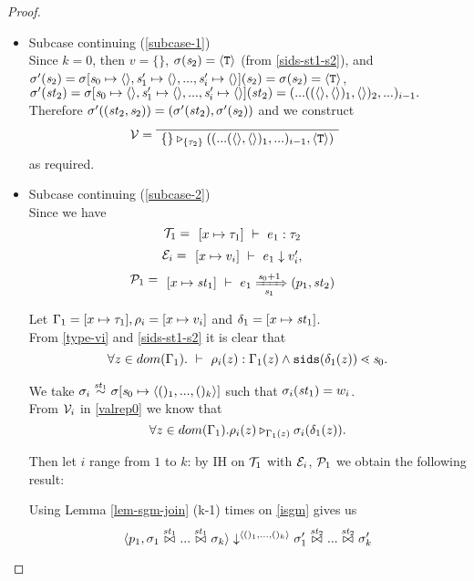 \begin{proof}
\begin{itemize}
\begin{enumerate}[(i)]
	\begin{itemize}
		\item Subcase continuing (\ref{subcase-1}) \\
		Since $k=0$, then $v = \{ \}$, $\sigma(\mathit{s}_2) = \langle \mathtt{T} \rangle$ (from \eqref{sids-st1-s2}), and \\
		$\sgm'(\s_2) = \sgm[\s_0 \|-> \emptyv, \s_1' \|-> \emptyv, ..., \s_i' \|-> \emptyv](\s_2) = \sgm(\s_2) = \oT$, \\
		$\sgm'(\st_2) = \sgm[\s_0 \|-> \emptyv, \s_1' \|-> \emptyv, ..., \s_i' \|-> \emptyv](\st_2) = (...((\emptyv,\emptyv)_1,\emptyv)_2,...)_{i-1}.$ \\
	
		Therefore $\sigma'((\mathit{st}_2,\mathit{s}_2)) = (\sigma'(\mathit{st}_2), \sigma'(\mathit{s}_2))$ and we construct 
		$$\MV = 
		 \PT{\Axiom{\ValRep{\{\}}{\tseq{\tau_2}}{((...(\emptyv,\emptyv)_1,...)_{i-1},\oT)}}}$$ as required.
		
		\item Subcase continuing (\ref{subcase-2}) \\
		Since we have 
		$$\MT_1 = \PT{\AC{\Type{[x \|-> {\tau_1}]}{e_1}{\tau_2}}}$$
		$$\ME_i = \PT{\AC{\Eval{[x \|-> {v_i}]}{e_1}{v_i',}}}$$
		$$\MP_1 = \PT{\AC{\Trans{[x \|-> {\st_1}]}{e_1}{\s_0+1}{\s_1}{\sfun{p_1}{\st_2}}}}$$
		
		Let $\Gam_1 = [x \|-> \tau_1], \rho_i= [x \|-> v_i]$ and $\del_1 = [x \|-> \st_1]$. \\
		From \eqref{type-vi} and \eqref{sids-st1-s2} it is clear that 
		$$\forall z \in dom(\Gam_1). \Type{}{\rho_i(z)}{\Gam_1(z)} \wedge 
		\sids{\del_1(z)} \.< \s_0 .$$
		
		We take $\sgm_i \~{\st_1} \sgm[\s_0 \|-> \<()_1,...,()_k \'>]$ 
		such that $\sigma_i(\mathit{st}_1)= w_i$. \\
		From $\mathcal{V}_i$ in \eqref{valrep0} we know that  
		$$\forall z \in dom(\Gamma_1). \rho_i(z) \triangleright_{\Gamma_1(z)} \sigma_i(\delta_1(z)).$$
	
		
		Then let $i$ range from $1$ to $k$: by IH on $\mathcal{T}_1$ with $\mathcal{E}_i$, $\mathcal{P}_1$ we obtain the following result:
		
	    Using Lemma \ref{lem-sgm-join} (k-1) times on \eqref{isgm} gives us
	    $$\seval{p_1}{\sgm_1 \x{\st_1} ... \x{\st_1} \sgm_k}{\<()_1,...,()_k \'>}{\sgm_1' \x{\st_2} ... \x{\st_2} \sgm'_k}$$
	    

\end{itemize}
\end{enumerate}
\end{itemize}
\end{proof}
